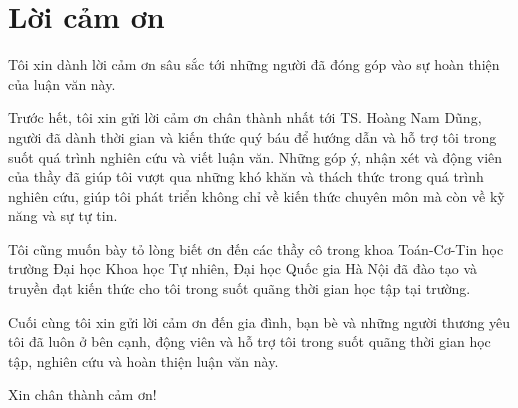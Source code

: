 \chapter*{Lời cảm ơn}
Tôi xin dành lời cảm ơn sâu sắc tới những người đã đóng góp vào sự hoàn thiện của luận văn này.

Trước hết, tôi xin gửi lời cảm ơn chân thành nhất tới TS. Hoàng Nam Dũng, người đã dành thời gian và kiến thức quý báu để hướng dẫn và hỗ trợ tôi trong suốt quá trình nghiên cứu và viết luận văn. Những góp ý, nhận xét và động viên của thầy đã giúp tôi vượt qua những khó khăn và thách thức trong quá trình nghiên cứu, giúp tôi phát triển không chỉ về kiến thức chuyên môn mà còn về kỹ năng và sự tự tin.

Tôi cũng muốn bày tỏ lòng biết ơn đến các thầy cô trong khoa Toán-Cơ-Tin học trường Đại học Khoa học Tự nhiên, Đại học Quốc gia Hà Nội đã đào tạo và truyền đạt kiến thức cho tôi trong suốt quãng thời gian học tập tại trường.

Cuối cùng tôi xin gửi lời cảm ơn đến gia đình, bạn bè và những người thương yêu tôi đã luôn ở bên cạnh, động viên và hỗ trợ tôi trong suốt quãng thời gian học tập, nghiên cứu và hoàn thiện luận văn này.

Xin chân thành cảm ơn!